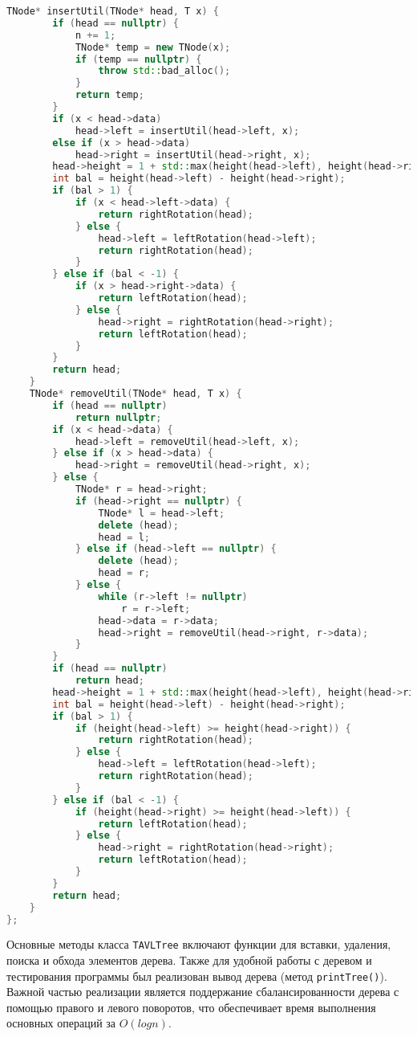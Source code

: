 \documentclass[12pt]{article}
\begin{document}
\begin{lstlisting}[language=C++]
    TNode* insertUtil(TNode* head, T x) {
        if (head == nullptr) {
            n += 1;
            TNode* temp = new TNode(x);
            if (temp == nullptr) {
                throw std::bad_alloc();
            }
            return temp;
        }
        if (x < head->data)
            head->left = insertUtil(head->left, x);
        else if (x > head->data)
            head->right = insertUtil(head->right, x);
        head->height = 1 + std::max(height(head->left), height(head->right));
        int bal = height(head->left) - height(head->right);
        if (bal > 1) {
            if (x < head->left->data) {
                return rightRotation(head);
            } else {
                head->left = leftRotation(head->left);
                return rightRotation(head);
            }
        } else if (bal < -1) {
            if (x > head->right->data) {
                return leftRotation(head);
            } else {
                head->right = rightRotation(head->right);
                return leftRotation(head);
            }
        }
        return head;
    }
    TNode* removeUtil(TNode* head, T x) {
        if (head == nullptr)
            return nullptr;
        if (x < head->data) {
            head->left = removeUtil(head->left, x);
        } else if (x > head->data) {
            head->right = removeUtil(head->right, x);
        } else {
            TNode* r = head->right;
            if (head->right == nullptr) {
                TNode* l = head->left;
                delete (head);
                head = l;
            } else if (head->left == nullptr) {
                delete (head);
                head = r;
            } else {
                while (r->left != nullptr)
                    r = r->left;
                head->data = r->data;
                head->right = removeUtil(head->right, r->data);
            }
        }
        if (head == nullptr)
            return head;
        head->height = 1 + std::max(height(head->left), height(head->right));
        int bal = height(head->left) - height(head->right);
        if (bal > 1) {
            if (height(head->left) >= height(head->right)) {
                return rightRotation(head);
            } else {
                head->left = leftRotation(head->left);
                return rightRotation(head);
            }
        } else if (bal < -1) {
            if (height(head->right) >= height(head->left)) {
                return leftRotation(head);
            } else {
                head->right = rightRotation(head->right);
                return leftRotation(head);
            }
        }
        return head;
    }
};
\end{lstlisting}
Основные методы класса \texttt{TAVLTree} включают функции для вставки, удаления, поиска и обхода элементов дерева. Также для удобной работы с деревом и тестирования программы был реализован вывод дерева (метод \texttt{printTree()}). Важной частью реализации является поддержание сбалансированности дерева с помощью правого и левого поворотов, что обеспечивает время выполнения основных операций за $O(log n)$.
\end{document}
